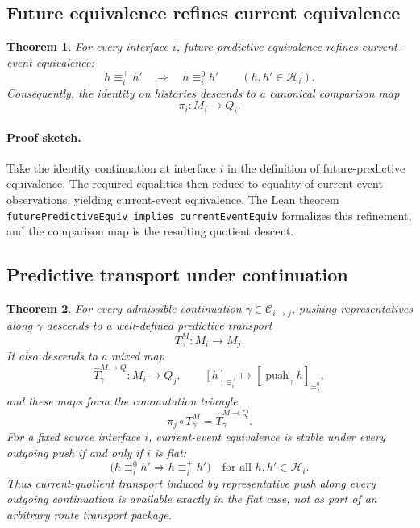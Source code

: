 \documentclass[11pt]{article}
\newcommand{\CurrentQ}{Q}
\newcommand{\PredictiveQ}{M}
\newcommand{\Histories}{\mathcal{H}}
\newcommand{\CurrentEquiv}{\equiv^{0}}
\newcommand{\FutureEquiv}{\equiv^{+}}
\newtheorem{theorem}{Theorem}[section]
\theoremstyle{definition}
\begin{document}
\subsection{Future equivalence refines current equivalence}\label{subsec:thm-refinement}
\begin{theorem}\label{thm:future-refines-current}
For every interface $i$, future-predictive equivalence refines current-event equivalence:
\[
h \FutureEquiv_i h'
\quad\Longrightarrow\quad
h \CurrentEquiv_i h'
\qquad
(h,h'\in\Histories_i).
\]
Consequently, the identity on histories descends to a canonical comparison map
\[
\pi_i : \PredictiveQ_i \to \CurrentQ_i.
\]
\end{theorem}

\paragraph{Proof sketch.}
Take the identity continuation at interface $i$ in the definition of future-predictive equivalence. The required equalities then reduce to equality of current event observations, yielding current-event equivalence. The Lean theorem \texttt{futurePredictiveEquiv\_implies\_currentEventEquiv} formalizes this refinement, and the comparison map is the resulting quotient descent.

\subsection{Predictive transport under continuation}\label{subsec:thm-transport}
\begin{theorem}\label{thm:predictive-transport}
For every admissible continuation $\gamma\in\mathcal{C}_{i\to j}$, pushing representatives along $\gamma$ descends to a well-defined predictive transport
\[
T^{\PredictiveQ}_{\gamma} : \PredictiveQ_i \to \PredictiveQ_j.
\]
It also descends to a mixed map
\[
\widehat T^{\PredictiveQ\to\CurrentQ}_{\gamma} :
\PredictiveQ_i \to \CurrentQ_j,
\qquad
[h]_{\FutureEquiv_i}\longmapsto
[\operatorname{push}_{\gamma}h]_{\CurrentEquiv_j},
\]
and these maps form the commutation triangle
\[
\pi_j \circ T^{\PredictiveQ}_{\gamma}
=
\widehat T^{\PredictiveQ\to\CurrentQ}_{\gamma}.
\]
For a fixed source interface $i$, current-event equivalence is stable under every outgoing push if and only if $i$ is flat:
\[
\bigl(h\CurrentEquiv_i h'\Longrightarrow h\FutureEquiv_i h'\bigr)
\quad\text{for all }h,h'\in\Histories_i.
\]
Thus current-quotient transport induced by representative push along every outgoing continuation is available exactly in the flat case, not as part of an arbitrary route transport package.
\end{theorem}
\end{document}
